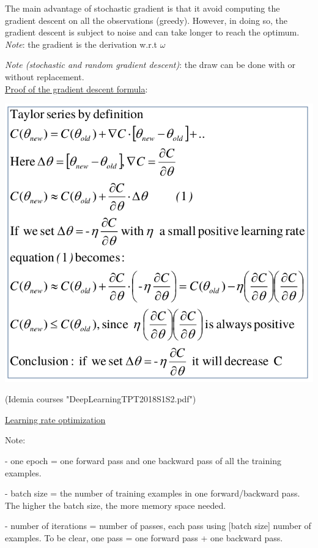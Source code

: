 The main advantage of stochastic gradient is that it avoid computing the gradient descent on all the observations (greedy). However, in doing so, the gradient descent is subject to noise and can take longer to reach the optimum. \\

\textit{Note}: the gradient is the derivation w.r.t $\omega$

\textit{Note (stochastic and random gradient descent)}: the draw can be done with or without replacement. \\



\underline{Proof of the gradient descent formula}:

\includegraphics[scale=0.3]{GradientDescent_proof.png}

(Idemia courses "DeepLearningTPT2018S1S2.pdf")

\vspace{5mm}
\underline{Learning rate optimization}
\vspace{5mm}

Note:

- one epoch = one forward pass and one backward pass of all the training examples.

- batch size = the number of training examples in one forward/backward pass. The higher the batch size, the more memory space needed.

- number of iterations = number of passes, each pass using [batch size] number of examples. To be clear, one pass = one forward pass + one backward pass.

